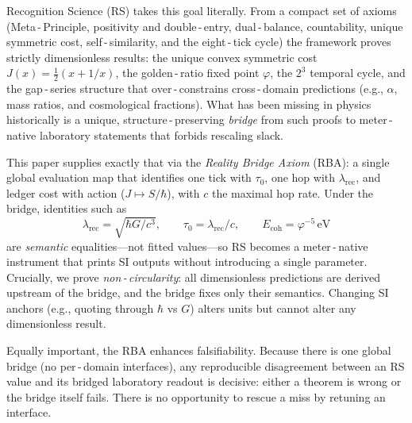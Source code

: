 \documentclass[11pt]{article}
\newcommand{\ph}{\varphi}
\newcommand{\lamrec}{\lambda_{\mathrm{rec}}}
\newcommand{\tauzero}{\tau_{0}}
\newcommand{\Ecoh}{E_{\mathrm{coh}}}
\theoremstyle{remark}
\begin{document}
Recognition Science (RS) takes this goal literally. From a compact set of axioms
(Meta\,\mbox{-}\,Principle, positivity and double\,\mbox{-}\,entry, dual\,\mbox{-}\,balance, countability, unique symmetric
cost, self\,\mbox{-}\,similarity, and the eight\,\mbox{-}\,tick cycle) the framework proves strictly
dimensionless results: the unique convex symmetric cost $J(x)=\tfrac12(x+1/x)$,
the golden\,\mbox{-}\,ratio fixed point $\ph$, the $2^{3}$ temporal cycle, and the gap\,\mbox{-}\,series
structure that over\,\mbox{-}\,constrains cross\,\mbox{-}\,domain predictions (e.g., $\alpha$, mass ratios,
and cosmological fractions). What has been missing in physics historically is a
unique, structure\,\mbox{-}\,preserving \emph{bridge} from such proofs to meter\,\mbox{-}\,native laboratory
statements that forbids rescaling slack.

This paper supplies exactly that via the \textit{Reality Bridge Axiom} (RBA): a single
global evaluation map that identifies one tick with $\tauzero$, one hop with $\lamrec$,
and ledger cost with action ($J\mapsto S/\hbar$), with $c$ the maximal hop rate.
Under the bridge, identities such as
\[
  \lamrec = \sqrt{\hbar G / c^{3}}, \qquad \tauzero = \lamrec / c, \qquad \Ecoh = \ph^{-5}\,\mathrm{eV}
\]
are \emph{semantic} equalities---not fitted values---so RS becomes a meter\,\mbox{-}\,native
instrument that prints SI outputs without introducing a single parameter. Crucially,
we prove \emph{non\,\mbox{-}\,circularity}: all dimensionless predictions are derived upstream of
the bridge, and the bridge fixes only their semantics. Changing SI anchors (e.g.,
quoting through $\hbar$ vs $G$) alters units but cannot alter any dimensionless result.

Equally important, the RBA enhances falsifiability. Because there is one global
bridge (no per\,\mbox{-}\,domain interfaces), any reproducible disagreement between an RS
value and its bridged laboratory readout is decisive: either a theorem is wrong or
the bridge itself fails. There is no opportunity to rescue a miss by retuning an
interface.
\end{document}
